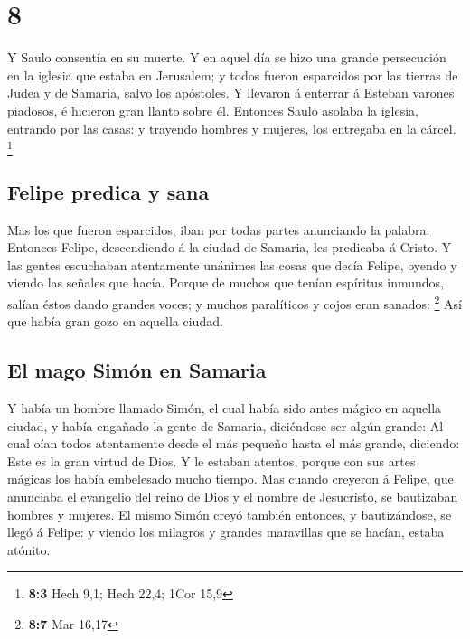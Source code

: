 \hypertarget{section-7}{%
\section{8}\label{section-7}}

 Y Saulo consentía en su muerte. Y en aquel día se hizo
una grande persecución en la iglesia que estaba en Jerusalem; y todos
fueron esparcidos por las tierras de Judea y de Samaria, salvo los
apóstoles.  Y llevaron á enterrar á Esteban varones
piadosos, é hicieron gran llanto sobre él.  Entonces Saulo
asolaba la iglesia, entrando por las casas: y trayendo hombres y
mujeres, los entregaba en la cárcel. \footnote{\textbf{8:3} Hech 9,1;
  Hech 22,4; 1Cor 15,9}

\hypertarget{felipe-predica-y-sana}{%
\subsection{Felipe predica y sana}\label{felipe-predica-y-sana}}

 Mas los que fueron esparcidos, iban por todas partes
anunciando la palabra.  Entonces Felipe, descendiendo á la
ciudad de Samaria, les predicaba á Cristo.  Y las gentes
escuchaban atentamente unánimes las cosas que decía Felipe, oyendo y
viendo las señales que hacía.  Porque de muchos que tenían
espíritus inmundos, salían éstos dando grandes voces; y muchos
paralíticos y cojos eran sanados: \footnote{\textbf{8:7} Mar 16,17}
 Así que había gran gozo en aquella ciudad.

\hypertarget{el-mago-simuxf3n-en-samaria}{%
\subsection{El mago Simón en
Samaria}\label{el-mago-simuxf3n-en-samaria}}

 Y había un hombre llamado Simón, el cual había sido antes
mágico en aquella ciudad, y había engañado la gente de Samaria,
diciéndose ser algún grande:  Al cual oían todos
atentamente desde el más pequeño hasta el más grande, diciendo: Este es
la gran virtud de Dios.  Y le estaban atentos, porque con
sus artes mágicas los había embelesado mucho tiempo.  Mas
cuando creyeron á Felipe, que anunciaba el evangelio del reino de Dios y
el nombre de Jesucristo, se bautizaban hombres y mujeres.
 El mismo Simón creyó también entonces, y bautizándose,
se llegó á Felipe: y viendo los milagros y grandes maravillas que se
hacían, estaba atónito.

